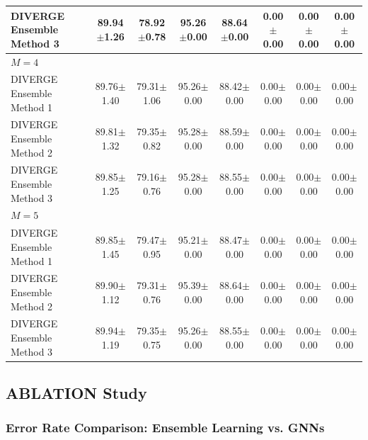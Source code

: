 \documentclass[a4paper,fleqn]{cas-sc}
\begin{document}
\begin{table}[htbp]
\begin{tabular*}{\textwidth}{@{\extracolsep{\fill}} lccccccc @{}}
DIVERGE Ensemble Method 3 & 89.94{\scriptsize$\pm$1.26} & 78.92{\scriptsize$\pm$0.78} & 95.26{\scriptsize$\pm$0.00} & 88.64{\scriptsize$\pm$0.00} & 0.00{\scriptsize$\pm$0.00} & 0.00{\scriptsize$\pm$0.00} & 0.00{\scriptsize$\pm$0.00} \\
\midrule
\multicolumn{8}{l}{\textit{$M=4$}} \\
\midrule
DIVERGE Ensemble Method 1 & 89.76{\scriptsize$\pm$1.40} & 79.31{\scriptsize$\pm$1.06} & 95.26{\scriptsize$\pm$0.00} & 88.42{\scriptsize$\pm$0.00} & 0.00{\scriptsize$\pm$0.00} & 0.00{\scriptsize$\pm$0.00} & 0.00{\scriptsize$\pm$0.00} \\
DIVERGE Ensemble Method 2 & 89.81{\scriptsize$\pm$1.32} & 79.35{\scriptsize$\pm$0.82} & 95.28{\scriptsize$\pm$0.00} & 88.59{\scriptsize$\pm$0.00} & 0.00{\scriptsize$\pm$0.00} & 0.00{\scriptsize$\pm$0.00} & 0.00{\scriptsize$\pm$0.00} \\
DIVERGE Ensemble Method 3 & 89.85{\scriptsize$\pm$1.25} & 79.16{\scriptsize$\pm$0.76} & 95.28{\scriptsize$\pm$0.00} & 88.55{\scriptsize$\pm$0.00} & 0.00{\scriptsize$\pm$0.00} & 0.00{\scriptsize$\pm$0.00} & 0.00{\scriptsize$\pm$0.00} \\
\midrule
\multicolumn{8}{l}{\textit{$M=5$}} \\
\midrule
DIVERGE Ensemble Method 1 & 89.85{\scriptsize$\pm$1.45} & 79.47{\scriptsize$\pm$0.95} & 95.21{\scriptsize$\pm$0.00} & 88.47{\scriptsize$\pm$0.00} & 0.00{\scriptsize$\pm$0.00} & 0.00{\scriptsize$\pm$0.00} & 0.00{\scriptsize$\pm$0.00} \\
DIVERGE Ensemble Method 2 & 89.90{\scriptsize$\pm$1.12} & 79.31{\scriptsize$\pm$0.76} & 95.39{\scriptsize$\pm$0.00} & 88.64{\scriptsize$\pm$0.00} & 0.00{\scriptsize$\pm$0.00} & 0.00{\scriptsize$\pm$0.00} & 0.00{\scriptsize$\pm$0.00} \\
DIVERGE Ensemble Method 3 & 89.94{\scriptsize$\pm$1.19} & 79.35{\scriptsize$\pm$0.75} & 95.26{\scriptsize$\pm$0.00} & 88.55{\scriptsize$\pm$0.00} & 0.00{\scriptsize$\pm$0.00} & 0.00{\scriptsize$\pm$0.00} & 0.00{\scriptsize$\pm$0.00} \\
\bottomrule
\end{tabular*}
\end{table}



\subsection{ABLATION Study}
\subsubsection{Error Rate Comparison: Ensemble Learning vs. GNNs}
\end{document}
